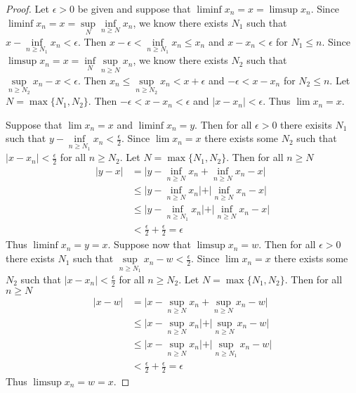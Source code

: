 \documentclass[12pt]{article}
\begin{document}
	\begin{proof}
		Let $\epsilon >0$ be given and suppose that $\liminf{x_n} = x = \limsup{x_n}$. Since $\liminf{x_n} = x = \sup\limits_N \inf\limits_{n \geq N}x_n$, we know there exists $N_1$ such that \\$x - \inf\limits_{n \geq N_1} x_n < \epsilon$. Then $x - \epsilon < \inf\limits_{n \geq N_1} x_n \leq x_n$ and $x - x_n < \epsilon$ for $N_1 \leq n$. Since $\limsup{x_n} = x = \inf\limits_N \sup\limits_{n \geq N}x_n$, we know there exists $N_2$ such that \\$\sup\limits_{n \geq N_2} x_n - x < \epsilon$. Then $x_n \leq \sup\limits_{n \geq N_2}x_n < x + \epsilon$ and $-\epsilon < x - x_n$ for $N_2 \leq n$. Let $N = \max\{N_1,N_2\}$. Then $-\epsilon < x - x_n < \epsilon$ and $\vert x - x_n \vert < \epsilon$. Thus $\lim x_n = x$. \bigbreak
		
		Suppose that $\lim x_n = x$ and $\liminf x_n = y$. Then for all $\epsilon > 0$ there exisits $N_1$ such that $y -  \inf\limits_{n \geq N_1}x_n < \tfrac{\epsilon}{2}$. Since $\lim x_n = x$ there exists some $N_2$ such that $\vert x - x_n \vert < \tfrac{\epsilon}{2}$ for all $n \geq N_2$. Let $N = \max\{N_1,N_2\}$. Then for all $n \geq N$
		\begin{align*}
			\vert y - x \vert & = \vert y - \inf\limits_{n \geq N}x_n + \inf\limits_{n \geq N}x_n - x \vert \\
			& \leq \vert y - \inf\limits_{n \geq N}x_n \vert + \vert \inf\limits_{n \geq N}x_n - x \vert \\
			& \leq \vert y - \inf\limits_{n \geq N_1}x_n \vert + \vert \inf\limits_{n \geq N}x_n - x \vert \\
			& < \tfrac{\epsilon}{2} + \tfrac{\epsilon}{2} = \epsilon
		\end{align*}
		Thus $\liminf x_n = y = x$. \bigbreak
		Suppose now that $\limsup x_n = w$. Then for all $\epsilon > 0$ there exists $N_1$ such that $\sup\limits_{n \geq N_1}x_n - w < \tfrac{\epsilon}{2}$. Since $\lim x_n = x$ there exists some $N_2$ such that $\vert x - x_n \vert < \tfrac{\epsilon}{2}$ for all $n \geq N_2$. Let $N = \max\{N_1,N_2\}$. Then for all $n \geq N$
		\begin{align*}
			\vert x - w \vert & = \vert x - \sup\limits_{n \geq N}x_n + \sup\limits_{n \geq N}x_n - w \vert \\
			& \leq \vert x - \sup\limits_{n \geq N}x_n \vert + \vert \sup\limits_{n \geq N}x_n - w \vert \\
			& \leq \vert x - \sup\limits_{n \geq N}x_n \vert + \vert \sup\limits_{n \geq N_1}x_n - w \vert \\
			& < \tfrac{\epsilon}{2} + \tfrac{\epsilon}{2} = \epsilon
		\end{align*}
		Thus $\limsup x_n = w = x$. \bigbreak
	\end{proof}
\end{document}
